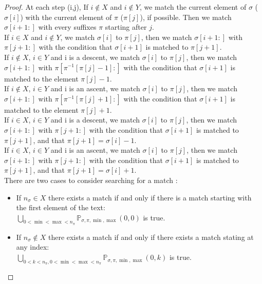 \documentclass[a4paper]{llncs}
\newcommand{\ptext}{\pi}
\newcommand{\pmotif}{\sigma}
\newcommand{\x}{X}
\newcommand{\y}{Y}
\begin{document}
\begin{proof}
			At each step (i,j),
			If $i \notin \x$ and $i \notin \y$,
			we match the current element of $\pmotif$ ($\pmotif[i]$)
			with the current element of $\ptext$ ($\ptext[j]$), if possible.
			Then we match $\pmotif[i+1:]$ with 
			every suffixes $\ptext$ starting after $j$.\\
			
			If $i \in \x$ and $i \notin \y$,
			we match $\pmotif[i]$ to $\ptext[j]$, 
			then we match $\pmotif[i+1:]$ with $\ptext[j+1:]$
			with the condition that
			$\pmotif[i+1]$ is matched to $\ptext[j+1]$.\\
			
			If $i \notin \x$, $i \in \y$ and i is a descent,
			we match $\pmotif[i]$ to $\ptext[j]$, 
			then we match $\pmotif[i+1:]$ 
			with $\ptext[\ptext^{-1}[\ptext[j]-1]:]$
			with the condition that
			$\pmotif[i+1]$ is matched to the element $\ptext[j]-1$.\\						
			
			If $i \notin \x$, $i \in \y$ and i is an ascent,
			we match $\pmotif[i]$ to $\ptext[j]$, 
			then we match $\pmotif[i+1:]$ 
			with $\ptext[\ptext^{-1}[\ptext[j]+1]:]$
			with the condition that
			$\pmotif[i+1]$ is matched to the element $\ptext[j]+1$.\\	

			If $i \in \x$, $i \in \y$ and i is a descent,
			we match $\pmotif[i]$ to $\ptext[j]$, 
			then we match $\pmotif[i+1:]$ with $\ptext[j+1:]$
			with the condition that
			$\pmotif[i+1]$ is matched to $\ptext[j+1]$,
			and that $\ptext[j+1]=\pmotif[i]-1$.\\			

			If $i \in \x$, $i \in \y$ and i is an ascent,
			we match $\pmotif[i]$ to $\ptext[j]$, 
			then we match $\pmotif[i+1:]$ with $\ptext[j+1:]$
			with the condition that
			$\pmotif[i+1]$ is matched to $\ptext[j+1]$,
			and that $\ptext[j+1]=\pmotif[i]+1$.\\		
					
			There are two cases to consider searching for a match :
			\begin{itemize}
				\item If $n_\pmotif \in \x$ there exists a match if and only if there is a match starting with the first element of the text:\\ $\bigcup_{0<\min<\max<n_\ptext}\mathbb{P}_{\pmotif,\ptext,\min,\max}(0,0)$ is true.
				\item If $n_\pmotif \notin \x$ there exists a match if and only if there exists a match stating at any index: \\	$\bigcup_{0<k<n_\ptext,0<\min<\max<n_\ptext}\mathbb{P}_{\pmotif,\ptext,\min,\max}(0,k)$
							is true.	
			\end{itemize}

			
		
			\end{proof}
			
\end{document}
